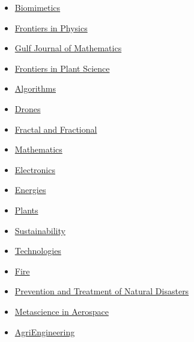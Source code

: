 \documentclass[final, a4paper, oneside, 12pt]{article}
\numberwithin{equation}{section}
\begin{document}
\begin{itemize}
    \item \href{https://www.mdpi.com/journal/biomimetics/}{Biomimetics}

    \item \href{https://www.frontiersin.org/journals/physics/}{Frontiers in Physics}

    \item \href{https://gjom.org/}{Gulf Journal of Mathematics}

    \item \href{https://www.frontiersin.org/journals/plant-science/}{
Frontiers in Plant Science}

    \item \href{https://www.mdpi.com/journal/algorithms/}{Algorithms}

    \item \href{https://www.mdpi.com/journal/drones/}{Drones}

    \item \href{https://www.mdpi.com/journal/fractalfract/}{Fractal and Fractional}

    \item \href{https://www.mdpi.com/journal/mathematics/}{Mathematics}

    \item \href{https://www.mdpi.com/journal/electronics/}{Electronics}

    \item \href{https://www.mdpi.com/journal/energies/}{Energies}

    \item \href{https://www.mdpi.com/journal/plants/}{Plants}

    \item \href{https://www.mdpi.com/journal/sustainability/}{Sustainability}

    \item \href{https://www.mdpi.com/journal/technologies/}{Technologies}

    \item \href{https://www.mdpi.com/journal/fire/}{Fire}

    \item \href{https://ojs.ukscip.com/index.php/ptnd/}{Prevention and Treatment of Natural Disasters}

    \item \href{https://www.aimspress.com/journal/mina/}{Metascience in Aerospace}

    \item \href{https://www.mdpi.com/journal/agriengineering/}{AgriEngineering}
    

\end{itemize}
\end{document}

